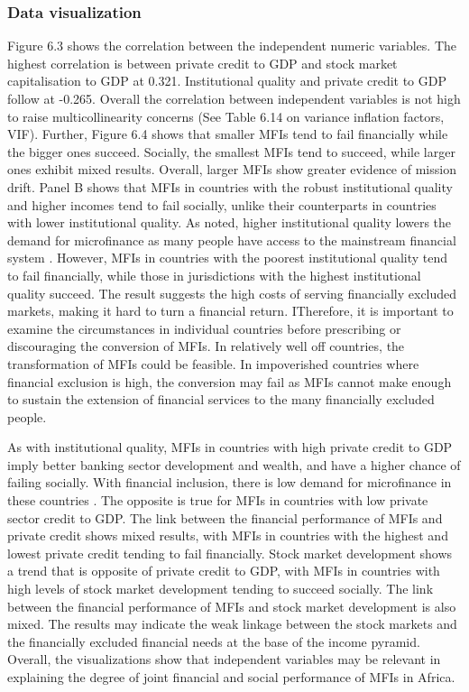 \documentclass[a4paper, nobind]{templates/ociamthesis}
\begin{document}
\hypertarget{data-visualization-1}{%
\subsubsection{Data visualization}\label{data-visualization-1}}

Figure 6.3 shows the correlation between the independent numeric variables. The highest correlation is between private credit to GDP and stock market capitalisation to GDP at 0.321. Institutional quality and private credit to GDP follow at -0.265. Overall the correlation between independent variables is not high to raise multicollinearity concerns (See Table 6.14 on variance inflation factors, VIF). Further, Figure 6.4 shows that smaller MFIs tend to fail financially while the bigger ones succeed. Socially, the smallest MFIs tend to succeed, while larger ones exhibit mixed results. Overall, larger MFIs show greater evidence of mission drift. Panel B shows that MFIs in countries with the robust institutional quality and higher incomes tend to fail socially, unlike their counterparts in countries with lower institutional quality. As noted, higher institutional quality lowers the demand for microfinance as many people have access to the mainstream financial system \autocite{allen2014african,allen2013resolving}. However, MFIs in countries with the poorest institutional quality tend to fail financially, while those in jurisdictions with the highest institutional quality succeed. The result suggests the high costs of serving financially excluded markets, making it hard to turn a financial return. ITherefore, it is important to examine the circumstances in individual countries before prescribing or discouraging the conversion of MFIs. In relatively well off countries, the transformation of MFIs could be feasible. In impoverished countries where financial exclusion is high, the conversion may fail as MFIs cannot make enough to sustain the extension of financial services to the many financially excluded people.

As with institutional quality, MFIs in countries with high private credit to GDP imply better banking sector development and wealth, and have a higher chance of failing socially. With financial inclusion, there is low demand for microfinance in these countries \autocite{huang2010political}. The opposite is true for MFIs in countries with low private sector credit to GDP. The link between the financial performance of MFIs and private credit shows mixed results, with MFIs in countries with the highest and lowest private credit tending to fail financially. Stock market development shows a trend that is opposite of private credit to GDP, with MFIs in countries with high levels of stock market development tending to succeed socially. The link between the financial performance of MFIs and stock market development is also mixed. The results may indicate the weak linkage between the stock markets and the financially excluded financial needs at the base of the income pyramid. Overall, the visualizations show that independent variables may be relevant in explaining the degree of joint financial and social performance of MFIs in Africa.
\end{document}
